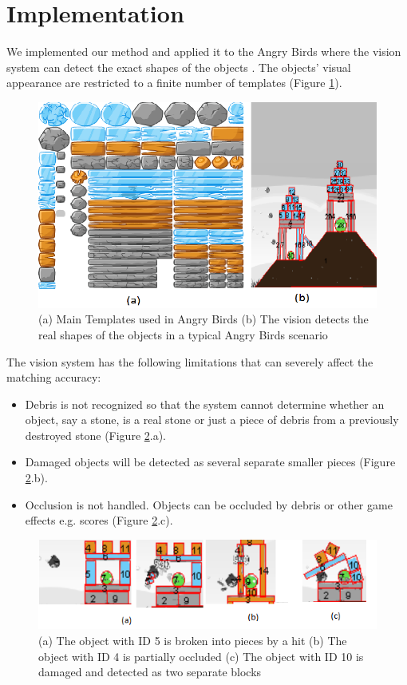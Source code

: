\documentclass[letterpaper]{article}
\begin{document}
\section{Implementation}
We implemented our method and applied it to the Angry Birds where the vision system can detect the exact shapes of the objects \cite{andrewwang}. The objects' visual appearance are restricted to a finite number of templates (Figure \ref{Templates}).  
\begin{figure}[t!]
\centering\includegraphics[scale=0.28]{Templates2.png}\caption{(a) Main Templates used in Angry Birds (b) The vision detects the real shapes of the objects in a typical Angry Birds scenario}
\label{Templates}
\end{figure}
The vision system has the following limitations that can severely affect the matching accuracy: 
\begin{itemize}
\item Debris is not recognized so that the system cannot determine whether an object, say a stone, is a real stone or just a piece of debris from a previously destroyed stone (Figure \ref{Fragments}.a).
\item Damaged objects will be detected as several separate smaller pieces (Figure \ref{Fragments}.b). 
\item Occlusion is not handled. Objects can be occluded by debris or other game effects e.g. scores (Figure \ref{Fragments}.c).
\end{itemize}
\begin{figure}[t!]
\centering\includegraphics[scale=0.6]{Fragmentation2.png}\caption{(a) The object with ID 5 is broken into pieces by a hit (b) The object with ID 4 is partially occluded (c) The object with ID 10 is damaged and detected as two separate blocks}
\label{Fragments}
\vspace{-5mm}
\end{figure}
\end{document}
